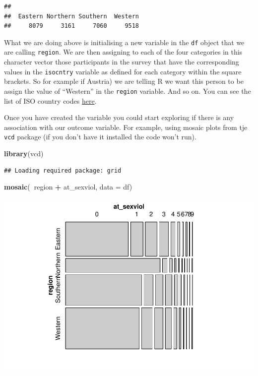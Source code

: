 \documentclass[]{book}
\newenvironment{Shaded}{\begin{snugshade}}{\end{snugshade}}
\newcommand{\DataTypeTok}[1]{\textcolor[rgb]{0.13,0.29,0.53}{#1}}
\newcommand{\KeywordTok}[1]{\textcolor[rgb]{0.13,0.29,0.53}{\textbf{#1}}}
\newcommand{\NormalTok}[1]{#1}
\newcommand{\OperatorTok}[1]{\textcolor[rgb]{0.81,0.36,0.00}{\textbf{#1}}}
\newcommand{\StringTok}[1]{\textcolor[rgb]{0.31,0.60,0.02}{#1}}
\theoremstyle{definition}
\theoremstyle{definition}
\theoremstyle{definition}
\theoremstyle{remark}
\begin{document}
\begin{verbatim}
## 
##  Eastern Northern Southern  Western 
##     8079     3161     7060     9518
\end{verbatim}

What we are doing above is initialising a new variable in the
\texttt{df} object that we are calling \texttt{region}. We are then
assigning to each of the four categories in this character vector those
participants in the survey that have the corresponding values in the
\texttt{isocntry} variable as defined for each category within the
square brackets. So for example if Austria) we are telling R we want
this person to be assign the value of ``Western'' in the \texttt{region}
variable. And so on. You can see the list of ISO country codes
\href{https://en.wikipedia.org/wiki/List_of_ISO_3166_country_codes}{here}.

Once you have created the variable you could start exploring if there is
any association with our outcome variable. For example, using mosaic
plots from tje \texttt{vcd} package (if you don't have it installed the
code won't run).

\begin{Shaded}
\begin{Highlighting}[]
\KeywordTok{library}\NormalTok{(vcd)}
\end{Highlighting}
\end{Shaded}

\begin{verbatim}
## Loading required package: grid
\end{verbatim}

\begin{Shaded}
\begin{Highlighting}[]
\KeywordTok{mosaic}\NormalTok{(}\OperatorTok{~}\NormalTok{region }\OperatorTok{+}\StringTok{ }\NormalTok{at_sexviol, }\DataTypeTok{data =}\NormalTok{ df)}
\end{Highlighting}
\end{Shaded}

\includegraphics{04-carpentry_files/figure-latex/unnamed-chunk-13-1.pdf}
\end{document}
